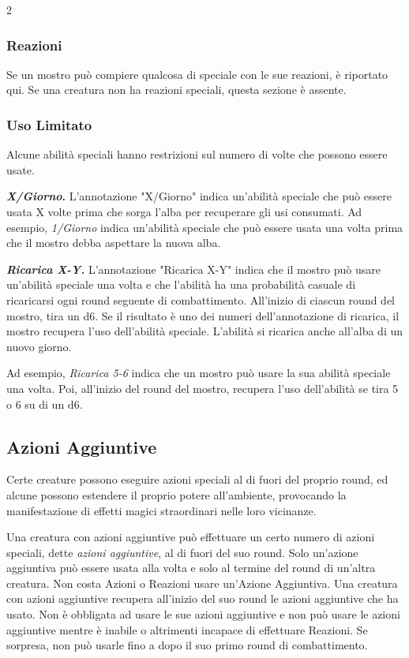 \begin{multicols}{2}
\subsubsection{Reazioni}

Se un mostro può compiere qualcosa di speciale con le sue reazioni, è riportato qui. Se una creatura non ha reazioni speciali, questa sezione è assente.

\subsubsection{Uso Limitato}

Alcune abilità speciali hanno restrizioni sul numero di volte che possono essere usate.

\textbf{\emph{X/Giorno}.} L'annotazione "X/Giorno" indica un'abilità speciale che può essere usata X volte prima che sorga l'alba per recuperare gli usi consumati. Ad esempio, \emph{1/Giorno} indica un'abilità speciale che può essere usata una volta prima che il mostro debba aspettare la nuova alba.

\emph{\textbf{Ricarica X-Y.}} L'annotazione "Ricarica X-Y" indica che il mostro può usare un'abilità speciale una volta e che l'abilità ha una probabilità casuale di ricaricarsi ogni round seguente di combattimento. All'inizio di ciascun round del mostro, tira un d6. Se il risultato è uno dei numeri dell'annotazione di ricarica, il mostro recupera l'uso dell'abilità speciale. L'abilità si ricarica anche all'alba di un nuovo giorno.

Ad esempio, \emph{Ricarica 5-6} indica che un mostro può usare la sua abilità speciale una volta. Poi, all'inizio del round del mostro, recupera l'uso dell'abilità se tira 5 o 6 su di un d6.

\subsection{Azioni Aggiuntive}

Certe creature possono eseguire azioni speciali al di fuori del proprio round, ed alcune possono estendere il proprio potere all'ambiente, provocando la manifestazione di effetti magici straordinari nelle loro vicinanze.

Una creatura con azioni aggiuntive può effettuare un certo numero di azioni speciali, dette \emph{azioni aggiuntive}, al di fuori del suo round. Solo un'azione aggiuntiva può essere usata alla volta e solo al termine del round di un'altra creatura. Non costa Azioni o Reazioni usare un'Azione Aggiuntiva. Una creatura con azioni aggiuntive recupera all'inizio del suo round le azioni aggiuntive che ha usato. Non è obbligata ad usare le sue azioni aggiuntive e non può usare le azioni aggiuntive mentre è inabile o altrimenti incapace di effettuare Reazioni. Se sorpresa, non può usarle fino a dopo il suo primo round di combattimento.


\end{multicols}
